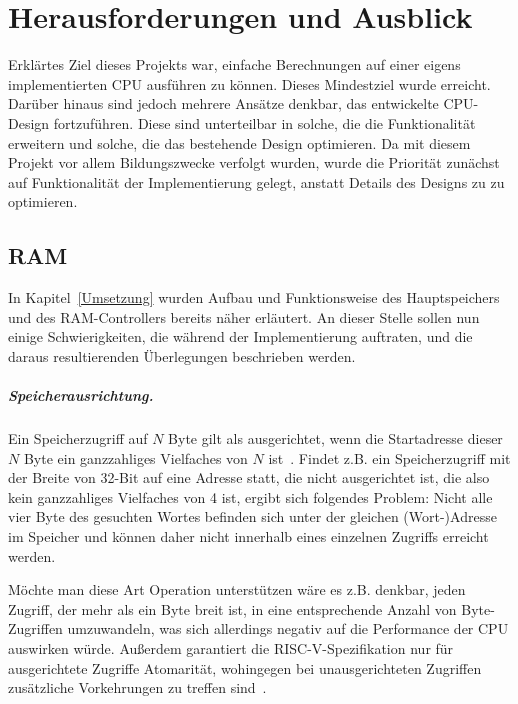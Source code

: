 \chapter{Herausforderungen und Ausblick} %
\label{Probleme} %

Erklärtes Ziel dieses Projekts war, einfache Berechnungen auf einer eigens implementierten CPU ausführen zu können. Dieses Mindestziel wurde erreicht. Darüber hinaus sind jedoch mehrere Ansätze denkbar, das entwickelte CPU-Design fortzuführen. Diese sind unterteilbar in solche, die die Funktionalität erweitern und solche, die das bestehende Design optimieren. Da mit diesem Projekt vor allem Bildungszwecke verfolgt wurden, wurde die Priorität zunächst auf Funktionalität der Implementierung gelegt, anstatt Details des Designs zu zu optimieren.

\section{RAM}

In Kapitel~\ref{Umsetzung} wurden Aufbau und Funktionsweise des Hauptspeichers und des RAM-Controllers bereits näher erläutert.
An dieser Stelle sollen nun einige Schwierigkeiten, die während der Implementierung auftraten, und die daraus resultierenden Überlegungen beschrieben werden.

\paragraph{Speicherausrichtung.} 
Ein Speicherzugriff auf $N$ Byte gilt als ausgerichtet, wenn die Startadresse dieser $N$ Byte ein ganzzahliges Vielfaches von $N$ ist~\cite[S. 96/97]{Hennessy}.
Findet z.B. ein Speicherzugriff mit der Breite von 32-Bit auf eine Adresse statt, die nicht ausgerichtet ist, die also kein ganzzahliges Vielfaches von 4 ist, ergibt sich folgendes Problem:
Nicht alle vier Byte des gesuchten Wortes befinden sich unter der gleichen (Wort-)Adresse im Speicher und können daher nicht innerhalb eines einzelnen Zugriffs erreicht werden.

Möchte man diese Art Operation unterstützen wäre es z.B. denkbar, jeden Zugriff, der mehr als ein Byte breit ist, in eine entsprechende Anzahl von Byte-Zugriffen umzuwandeln, was sich allerdings negativ auf die Performance der CPU auswirken würde.
Außerdem garantiert die RISC-V-Spezifikation nur für ausgerichtete Zugriffe Atomarität, wohingegen bei unausgerichteten Zugriffen zusätzliche Vorkehrungen zu treffen sind~\cite[S. 18]{RISC}.

